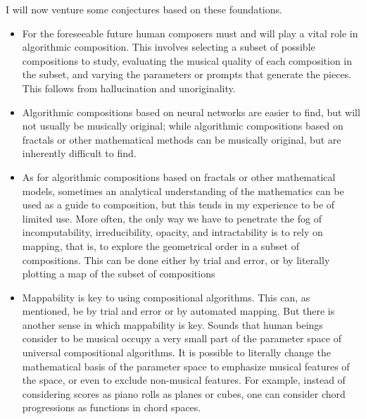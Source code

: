 \documentclass[11pt]{amsart}
\begin{document}
I will now venture some conjectures based on these foundations.

\begin{itemize}
\item For the foreseeable future human composers must and will play a vital role in algorithmic composition. This involves selecting a subset of possible compositions to study, evaluating the musical quality of each composition in the subset, and varying the parameters or prompts that generate the pieces. This follows from hallucination and unoriginality.
\item Algorithmic compositions based on neural networks are easier to find, but will not usually be musically original; while algorithmic compositions based on fractals or other mathematical methods can be musically original, but are inherently difficult to find.
\item As for algorithmic compositions based on fractals or other mathematical models, sometimes an analytical understanding of the mathematics can be used as a guide to composition, but this tends in my experience to be of limited use. More often, the only way we have to penetrate the fog of incomputability, irreducibility, opacity, and intractability is to rely on mapping, that is, to explore the geometrical order in a subset of compositions. This can be done either by trial and error, or by literally plotting a map of the subset of compositions
\item Mappability is key to using compositional algorithms. This can, as mentioned, be by trial and error or by automated mapping. But there is another sense in which mappability is key. Sounds that human beings consider to be musical occupy a very small part of the parameter space of universal compositional algorithms. It is possible to literally change the mathematical basis of the parameter space to emphasize musical features of the space, or even to exclude non-musical features. For example, instead of considering scores as piano rolls as planes or cubes, one can consider chord progressions as functions in chord spaces.
\end{itemize}









%
\printbibliography
\end{document}
